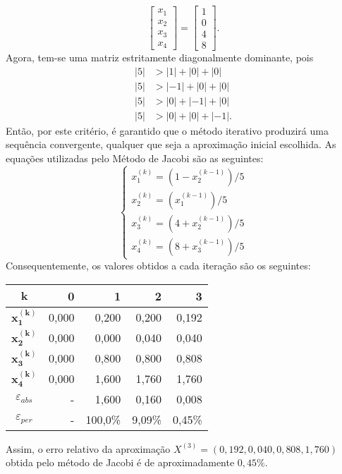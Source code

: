\documentclass[12pt,a4paper]{article}
\begin{document}
\begin{ExerciseList}
\[\begin{bmatrix}
x_1 \\ x_2 \\ x_3 \\ x_4
\end{bmatrix}
=
\begin{bmatrix}
1 \\ 0 \\ 4 \\ 8
\end{bmatrix}.
\]
Agora, tem-se uma matriz estritamente diagonalmente dominante, pois
\begin{align*}
|5| & > |1| + |0| + |0|\\
|5| & > |-1| + |0| + |0|\\
|5| & > |0| + |-1| + |0|\\
|5| & > |0| + |0| + |-1|.
\end{align*}
Então, por este critério, é garantido que o método iterativo produzirá uma sequência convergente, qualquer que seja a aproximação inicial escolhida. As equações utilizadas pelo Método de Jacobi são as seguintes:
\[
\begin{cases}
x_1^{(k)} = (1 - x_2^{(k-1)})/5\\
x_2^{(k)} = (x_1^{(k-1)})/5\\
x_3^{(k)} = (4 + x_2^{(k-1)})/5\\
x_4^{(k)} = (8 + x_3^{(k-1)})/5
\end{cases}
\]
Consequentemente, os valores obtidos a cada iteração são os seguintes:
\medskip
\begin{center}
\begin{tabular}{crrrr}
\hline
$\boldsymbol{k}$     & 0 & 1 & 2 & 3\\
\hline
$\boldsymbol{x_1^{(k)}}$ & 0,000 & 0,200 & 0,200 & 0,192 \\
$\boldsymbol{x_2^{(k)}}$ & 0,000 & 0,000 & 0,040 & 0,040 \\
$\boldsymbol{x_3^{(k)}}$ & 0,000 & 0,800 & 0,800 & 0,808 \\
$\boldsymbol{x_4^{(k)}}$ & 0,000 & 1,600 & 1,760 & 1,760 \\
\hline
$\varepsilon_{abs}$ & - & 1,600 & 0,160 & 0,008 \\
\hline
$\varepsilon_{per}$ & - & 100,0\% & 9,09\% & 0,45\% \\
\hline
\end{tabular}
\end{center}
\medskip

Assim, o erro relativo da aproximação $X^{(3)} = (0,192, 0,040, 0,808, 1,760)$ obtida pelo método de Jacobi é de aproximadamente $0,45\%$.



\end{ExerciseList}
\end{document}
